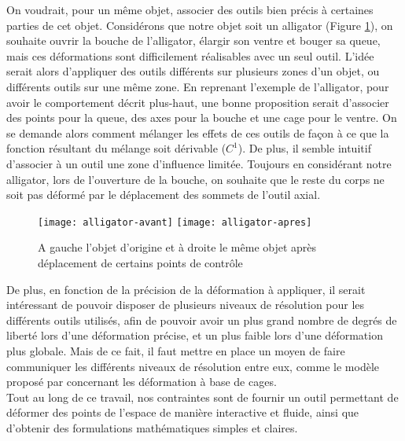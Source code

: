 On voudrait, pour un même objet, associer des outils bien précis à
certaines parties de cet objet. Considérons que notre objet soit un
alligator (Figure \ref{INTall}), on souhaite ouvrir la bouche de
l'alligator, élargir son ventre et bouger sa queue, mais ces
déformations sont difficilement réalisables avec un seul outil. L'idée
serait alors d'appliquer des outils différents sur plusieurs zones
d'un objet, ou différents outils sur une même zone. En reprenant
l'exemple de l'alligator, pour avoir le comportement décrit plus-haut,
une bonne proposition serait d'associer des points pour la queue, des
axes pour la bouche et une cage pour le ventre. On se demande alors
comment mélanger les effets de ces outils de façon à ce que la
fonction résultant du mélange soit dérivable ($C^1$). De plus, il
semble intuitif d'associer à un outil une zone d'influence
limitée. Toujours en considérant notre alligator, lors de l'ouverture
de la bouche, on souhaite que le reste du corps ne soit pas déformé
par le déplacement des sommets de l'outil axial.
\\

\begin{figure}[h]
  \texttt{[image: alligator-avant]}
  \texttt{[image: alligator-apres]}
  \caption{A gauche l'objet d'origine et à droite le même objet après
    déplacement de certains points de contrôle}
  \label{INTall}
\end{figure}

De plus, en fonction de la précision de la déformation à appliquer, il
serait intéressant de pouvoir disposer de plusieurs niveaux de
résolution pour les différents outils utilisés, afin de pouvoir avoir
un plus grand nombre de degrés de liberté lors d'une déformation
précise, et un plus faible lors d'une déformation plus globale. Mais
de ce fait, il faut mettre en place un moyen de faire communiquer les
différents niveaux de résolution entre eux, comme le modèle proposé
par \cite{Hur12} concernant les déformation à base de cages.
\\

Tout au long de ce travail, nos contraintes sont de fournir un outil
permettant de déformer des points de l'espace de manière interactive
et fluide, ainsi que d'obtenir des formulations mathématiques simples
et claires.


